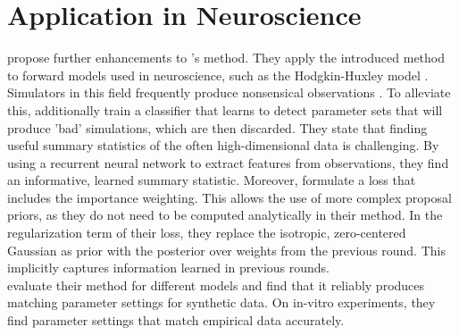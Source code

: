 \documentclass[12pt]{article}
\begin{document}
%


\section*{Application in Neuroscience}
\citet{lueckmann2017flexible} propose further enhancements to \citet{papamakarios2016fast}'s method. They apply the introduced method to forward models used in neuroscience, such as the Hodgkin-Huxley model \cite{hodgkin1952quantitative}. Simulators in this field frequently produce nonsensical observations \citep{lueckmann2017flexible}. To alleviate this, \citet{lueckmann2017flexible} additionally train a classifier that learns to detect parameter sets that will produce 'bad' simulations, which are then discarded. They state that finding useful summary statistics of the often high-dimensional data is challenging. By using a  recurrent neural network to extract features from observations, they find an informative, learned summary statistic. Moreover, \citet{lueckmann2017flexible} formulate a loss that includes the importance weighting. This allows the use of more complex proposal priors, as they do not need to be computed analytically in their method. In the regularization term of their loss, they replace the isotropic, zero-centered Gaussian as prior with the posterior over weights from the previous round. This implicitly captures information learned in previous rounds.\\
\citet{lueckmann2017flexible} evaluate their method for different models and find that it reliably produces matching parameter settings for synthetic data. On in-vitro experiments, they find parameter settings that match empirical data accurately.
\end{document}
